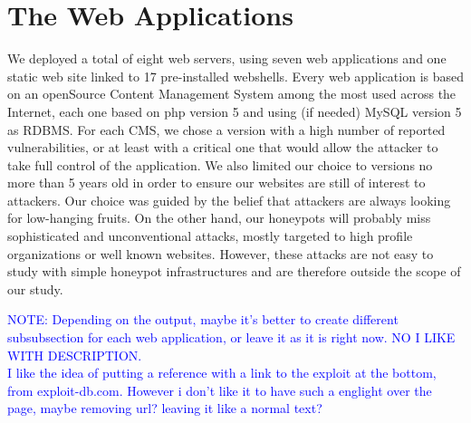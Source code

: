 \section{The Web Applications}
We deployed a total of eight web servers, using seven web applications and one static web site linked to 17 pre-installed webshells. Every web application is based on an openSource Content Management System among the most used across the Internet, each one based on php version 5 and using (if needed) MySQL version 5 as RDBMS. For each CMS, we chose a version with a high number of reported vulnerabilities, or at least with a critical one that would allow the attacker to take full control of the application. We also limited our choice to versions no more than 5 years old in order to ensure our websites are still of interest to attackers.
Our choice was guided by the belief that attackers are always looking for low-hanging fruits. On the other hand, our honeypots will probably miss sophisticated and unconventional attacks, mostly targeted to high profile organizations or well known websites. However, these attacks are not easy to study with simple honeypot infrastructures and are therefore outside the scope of our study.

\textcolor{blue}{NOTE: Depending on the output, maybe it's better to create different subsubsection for each web application, or leave it as it is right now. NO I LIKE WITH DESCRIPTION. \\
I like the idea of putting a reference with a link to the exploit at the bottom, from exploit-db.com. However i don't like it to have such a englight over the page, maybe removing url? leaving it like a normal text?}


